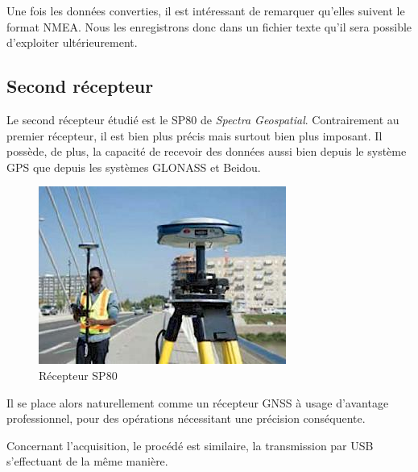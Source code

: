       Une fois les données converties, il est intéressant de remarquer qu'elles suivent le format NMEA\@.
      Nous les enregistrons donc dans un fichier texte qu'il sera possible d'exploiter ultérieurement.

   \subsection{Second récepteur}\label{subsec:second-recepteur}
      Le second récepteur étudié est le SP80 de \textit{Spectra Geospatial}.
      Contrairement au premier récepteur, il est bien plus précis mais surtout bien plus imposant.
      Il possède, de plus, la capacité de recevoir des données aussi bien depuis le système GPS que depuis les systèmes GLONASS et Beidou.

      \begin{figure}[h]
          \centering
          \includegraphics[width=.45\textwidth]{imgs/sp80}
          \caption{Récepteur SP80}
          \label{fig:sp80}
      \end{figure}

      Il se place alors naturellement comme un récepteur GNSS à usage d'avantage professionnel, pour des opérations nécessitant une précision conséquente.

      Concernant l'acquisition, le procédé est similaire, la transmission par USB s'effectuant de la même manière.